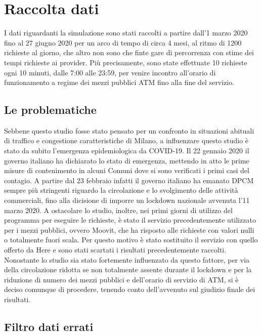 \section{Raccolta dati}

I dati riguardanti la simulazione sono stati raccolti a partire dall'1 marzo 2020 fino al 27 giugno 2020 per un arco di tempo di circa 4 mesi, al ritmo di 1200 richieste al giorno, che altro non sono che finte gare di percorrenza con stime dei tempi richieste ai provider. Più precisamente, sono state effettuate 10 richieste ogni 10 minuti, dalle 7:00 alle 23:59, per venire incontro all'orario di funzionamento a regime dei mezzi pubblici ATM fino alla fine del servizio.

\subsection{Le problematiche}

Sebbene questo studio fosse stato pensato per un confronto in situazioni abituali di traffico e congestione caratteristiche di Milano, a influenzare questo studio è stato da subito l'emergenza epidemiologica da COVID-19. Il 22 gennaio 2020 il governo italiano ha dichiarato lo stato di emergenza, mettendo in atto le prime misure di contenimento in alcuni Comuni dove si sono verificati i primi casi del contagio. A partire dal 23 febbraio infatti il governo italiano ha emanato DPCM sempre più stringenti riguardo la circolazione e lo svolgimento delle attività commerciali, fino alla dicisione di imporre un lockdown nazionale avvenuta l'11 marzo 2020\cite{misuredelgovernopercovid}. A ostacolare lo studio, inoltre, nei primi giorni di utilizzo del programma per eseguire le richieste, è stato il servizio precedentemente utilizzato per i mezzi pubblici, ovvero Moovit, che ha risposto alle richieste con valori nulli o totalmente fuori scala. Per questo motivo è stato sostituito il servizio con quello offerto da Here e sono stati scartati i risultati precedentemente raccolti. Nonostante lo studio sia stato fortemente influenzato da questo fattore, per via della circolazione ridotta se non totalmente assente durante il lockdown e per la riduzione di numero dei mezzi pubblici e dell'orario di servizio di ATM, si è deciso comunque di procedere, tenendo conto dell'avvenuto sul giudizio finale dei risultati.

\subsection{Filtro dati errati}

